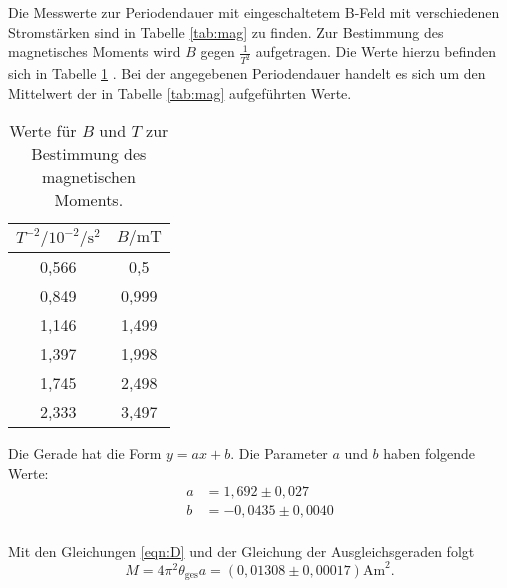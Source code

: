 Die Messwerte zur Periodendauer mit eingeschaltetem B-Feld mit verschiedenen Stromstärken sind in Tabelle \ref{tab:mag} zu finden.
Zur Bestimmung des magnetisches Moments wird $B$ gegen $\frac{1}{T^2}$ aufgetragen. Die Werte hierzu befinden sich in Tabelle \ref{tab:mag2} . Bei der angegebenen Periodendauer handelt es sich um den Mittelwert der in Tabelle \ref{tab:mag} aufgeführten Werte.

\begin{table}
  \caption{Werte für $B$ und $T$ zur Bestimmung des magnetischen Moments.}
  \centering
  \label{tab:mag2}
  \begin{tabular}{c c }
    \toprule
    $T^{-2} / 10^{-2} {\si{\per\second\squared}}$ & $B/ \si{\milli\tesla}$ \\
    \midrule
    0,566 & 0,5 \\
    0,849 & 0,999 \\
    1,146 & 1,499 \\
    1,397 & 1,998 \\
    1,745 & 2,498 \\
    2,333 & 3,497 \\
    \bottomrule
    \end{tabular}
\end{table}


Die Gerade hat die Form $y=ax+b$. Die Parameter $a$ und $b$ haben folgende Werte:
\begin{align}
  a&=1,692 \pm 0,027 \\
  b&= -0,0435 \pm 0,0040 \\
\end{align}

Mit den Gleichungen \ref{eqn:D} und der Gleichung der Ausgleichsgeraden folgt
\begin{equation}
  M = 4\pi^2 \theta_\mathrm{ges} a = (0,01308 \pm 0,00017) \si{\ampere \meter}^2.
\end{equation}
